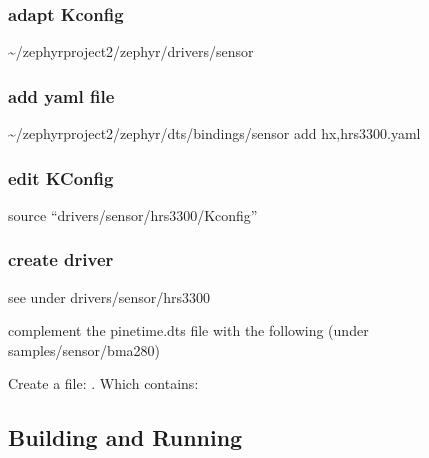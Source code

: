 \documentclass[letterpaper,10pt,english]{sphinxmanual}
\begin{document}
\subsubsection{adapt Kconfig}
\label{\detokenize{drivers/hrs3300:adapt-kconfig}}
\textasciitilde{}/zephyrproject\sphinxhyphen{}2/zephyr/drivers/sensor


\subsubsection{add yaml file}
\label{\detokenize{drivers/hrs3300:add-yaml-file}}
\textasciitilde{}/zephyrproject\sphinxhyphen{}2/zephyr/dts/bindings/sensor
add  hx,hrs3300.yaml


\subsubsection{edit KConfig}
\label{\detokenize{drivers/hrs3300:edit-kconfig}}
source “drivers/sensor/hrs3300/Kconfig”


\subsubsection{create driver}
\label{\detokenize{drivers/hrs3300:create-driver}}
see under drivers/sensor/hrs3300

complement the pinetime.dts file with the following (under samples/sensor/bma280)

\begin{sphinxVerbatim}[commandchars=\\\{\}]
\end{sphinxVerbatim}

Create a file: .
Which contains:

\begin{sphinxVerbatim}[commandchars=\\\{\}]
 
\end{sphinxVerbatim}


\subsection{Building and Running}
\label{\detokenize{drivers/hrs3300:building-and-running}}
\end{document}
